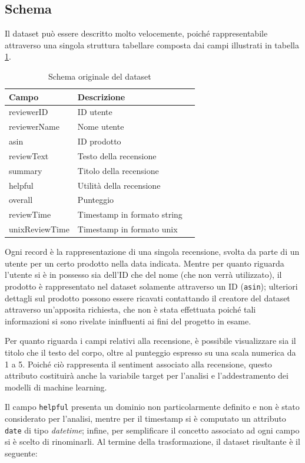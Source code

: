 \documentclass[hidelinks, 12pt]{article}
\begin{document}
\subsection{Schema}

Il dataset può essere descritto molto velocemente, poiché rappresentabile attraverso una singola struttura tabellare composta dai campi illustrati in tabella \ref{tab:df-schema}.

\begin{table}[H]
	\caption{Schema originale del dataset}\label{tab:df-schema}
	\centering
	\begin{tabular}{|l|l|l|}
		\hline
		Campo & Descrizione \\
		\hline
		reviewerID & ID utente \\
		reviewerName & Nome utente \\
		asin & ID prodotto \\
		reviewText & Testo della recensione \\
		summary & Titolo della recensione \\
		helpful & Utilità della recensione \\
		overall & Punteggio \\
		reviewTime & Timestamp in formato string \\
		unixReviewTime & Timestamp in formato unix \\
		\hline
	\end{tabular}
\end{table}

Ogni record è la rappresentazione di una singola recensione, svolta da parte di un utente per un certo prodotto nella data indicata. Mentre per quanto riguarda l'utente si è in possesso sia dell'ID che del nome (che non verrà utilizzato), il prodotto è rappresentato nel dataset solamente attraverso un ID (\texttt{asin}); ulteriori dettagli sul prodotto possono essere ricavati contattando il creatore del dataset attraverso un'apposita richiesta, che non è stata effettuata poiché tali informazioni si sono rivelate ininfluenti ai fini del progetto in esame.

Per quanto riguarda i campi relativi alla recensione, è possibile visualizzare sia il titolo che il testo del corpo, oltre al punteggio espresso su una scala numerica da 1 a 5. Poiché ciò rappresenta il sentiment associato alla recensione, questo attributo costituirà anche la variabile target per l'analisi e l'addestramento dei modelli di machine learning.

Il campo \texttt{helpful} presenta un dominio non particolarmente definito e non è stato considerato per l'analisi, mentre per il timestamp si è computato un attributo \texttt{date} di tipo \textit{datetime}; infine, per semplificare il concetto associato ad ogni campo si è scelto di rinominarli. Al termine della trasformazione, il dataset risultante è il seguente:
\end{document}
